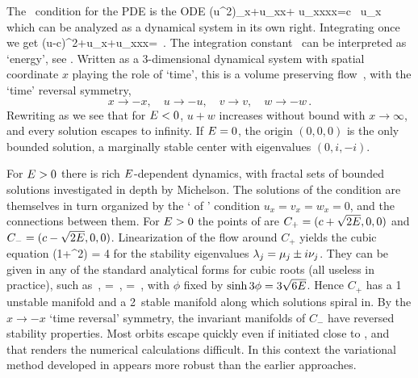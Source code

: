 The \reqv\ condition for the {\KS} PDE 
is the ODE
\beq
{\textstyle{}}(u^2)_x+u_{xx}+ u_{xxxx}=c \, u_x
which can be analyzed as a dynamical system in its own right.
Integrating once we get
\beq
{\textstyle{}}(u-c)^2+u_x+u_{xxx}=\expctE
\,.
\label{eq:stdks}
\eeq
The integration constant \expctE\ can be interpreted as `energy',
see .
Written as a 3-dimen\-si\-on\-al dynamical system
with spatial coordinate $x$ playing the role of `time',
this is a volume preserving flow
\beq
{}
\,,
  \label{eq:3dks}
\eeq
with the `time' reversal symmetry,
\[
x \to -x,\quad u \to -u, \quad v \to v, \quad w \to -w \,.
\]
 Rewriting  as
\beq
{}
we see that
for $\expctE<0$, $u+w$ increases without bound with $x \to \infty$,
and every solution escapes to infinity.
If $\expctE=0$, the origin $(0,0,0)$ is the
only bounded  solution, a marginally stable center with
eigenvalues $(0, i,-i)$.

For $\expctE>0$ there is rich
$\expctE$-dependent dynamics, with
fractal sets of bounded solutions investigated in
depth by Michelson.
The solutions of the {\eqv}  condition
 are themselves in turn organized by the
`{\eqva}  of {\eqva}'  condition
\( u_x= v_x= w_x= 0 \), and
the connections between them.
    For $\expctE>0$ the {\reqva}  points of  are
$C_{+}=(c+\sqrt{2\expctE},0,0)$ and $C_{-}=(c-\sqrt{2\expctE},0,0)$.
Linearization of the flow around
$C_{+}$ yields the cubic equation
  \beq
\eigExp(1+\eigExp^2) = 4 \expctE
for the
stability eigenvalues
$\eigExp[j] = \eigRe[j] \pm i \eigIm[j]$.
They can
be given in any of the standard analytical forms for cubic
roots  (all useless in practice), such as
    \,,\qquad
\eigRe=\sinh \phi
\,,\qquad
\eigIm=\cosh \phi \, ,
with $\phi$ fixed by $\sinh 3\phi=3\sqrt{6\expctE}$.
Hence $C_{+}$ has a {1\dmn}
unstable manifold and a 2\dmn\ stable manifold
along which solutions spiral in.
By the $x \to -x$ `time reversal' symmetry, the
invariant manifolds of $C_{-}$
have reversed stability properties.
Most orbits escape quickly even if initiated close to \eqva, and that
renders the numerical calculations
difficult.
In this context the variational method
developed in 
appears more robust than
the earlier approaches.


